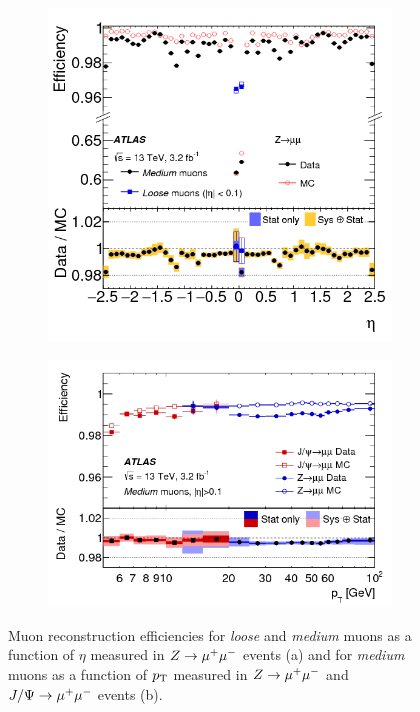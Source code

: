 \begin{figure}[!htb]
    \begin{center}
        \begin{subfigure}[c]{0.45\textwidth}
            \includegraphics[width=\textwidth]{./figures/object_selection/mu_id_eff_a.png}
            \caption{}
        \end{subfigure}
        \hfill
        \begin{subfigure}[c]{0.45\textwidth}
            \includegraphics[width=\textwidth]{./figures/object_selection/mu_id_eff_b.png}
            \caption{}
        \end{subfigure}
        \caption{Muon reconstruction efficiencies for \emph{loose} and \emph{medium} muons as a function of $\eta$
                measured in $Z \to \mu^+\mu^-$ events (a) and for \emph{medium} muons as a function of $p_\text{T}$ measured in
                $Z \to \mu^+\mu^-$ and $J/\Psi \to \mu^+\mu^-$ events (b).~\cite{PERF-2015-10}}\label{fig:object_selection:mu_id_eff}
    \end{center}
\end{figure}


